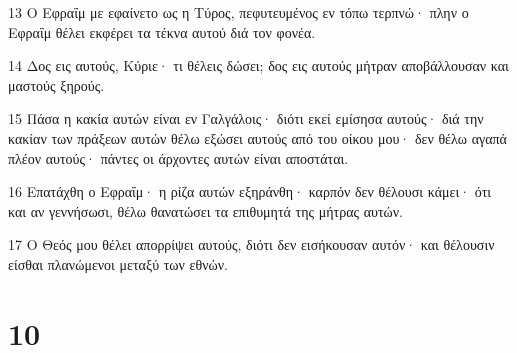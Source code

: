 \par 13 Ο Εφραΐμ με εφαίνετο ως η Τύρος, πεφυτευμένος εν τόπω τερπνώ· πλην ο Εφραΐμ θέλει εκφέρει τα τέκνα αυτού διά τον φονέα.
\par 14 Δος εις αυτούς, Κύριε· τι θέλεις δώσει; δος εις αυτούς μήτραν αποβάλλουσαν και μαστούς ξηρούς.
\par 15 Πάσα η κακία αυτών είναι εν Γαλγάλοις· διότι εκεί εμίσησα αυτούς· διά την κακίαν των πράξεων αυτών θέλω εξώσει αυτούς από του οίκου μου· δεν θέλω αγαπά πλέον αυτούς· πάντες οι άρχοντες αυτών είναι αποστάται.
\par 16 Επατάχθη ο Εφραΐμ· η ρίζα αυτών εξηράνθη· καρπόν δεν θέλουσι κάμει· ότι και αν γεννήσωσι, θέλω θανατώσει τα επιθυμητά της μήτρας αυτών.
\par 17 Ο Θεός μου θέλει απορρίψει αυτούς, διότι δεν εισήκουσαν αυτόν· και θέλουσιν είσθαι πλανώμενοι μεταξύ των εθνών.

\chapter{10}

